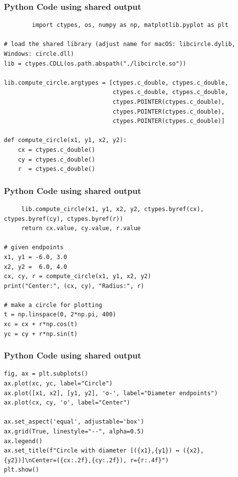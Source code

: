 \documentclass{beamer}
\begin{document}
\begin{frame}[fragile]
	\frametitle{Python Code using shared output}
	\begin{lstlisting}
		import ctypes, os, numpy as np, matplotlib.pyplot as plt

# load the shared library (adjust name for macOS: libcircle.dylib, Windows: circle.dll)
lib = ctypes.CDLL(os.path.abspath("./libcircle.so"))

lib.compute_circle.argtypes = [ctypes.c_double, ctypes.c_double,
                               ctypes.c_double, ctypes.c_double,
                               ctypes.POINTER(ctypes.c_double),
                               ctypes.POINTER(ctypes.c_double),
                               ctypes.POINTER(ctypes.c_double)]

def compute_circle(x1, y1, x2, y2):
    cx = ctypes.c_double()
    cy = ctypes.c_double()
    r  = ctypes.c_double()
	\end{lstlisting}
\end{frame}
\begin{frame}[fragile]
	\frametitle{Python Code using shared output}
	\begin{lstlisting}	
     lib.compute_circle(x1, y1, x2, y2, ctypes.byref(cx), ctypes.byref(cy), ctypes.byref(r))
     return cx.value, cy.value, r.value

# given endpoints
x1, y1 = -6.0, 3.0
x2, y2 =  6.0, 4.0
cx, cy, r = compute_circle(x1, y1, x2, y2)
print("Center:", (cx, cy), "Radius:", r)

# make a circle for plotting
t = np.linspace(0, 2*np.pi, 400)
xc = cx + r*np.cos(t)
yc = cy + r*np.sin(t)

	\end{lstlisting}
\end{frame}
\begin{frame}[fragile]
	\frametitle{Python Code using shared output}
	\begin{lstlisting}
fig, ax = plt.subplots()
ax.plot(xc, yc, label="Circle")
ax.plot([x1, x2], [y1, y2], 'o-', label="Diameter endpoints")
ax.plot(cx, cy, 'o', label="Center")

ax.set_aspect('equal', adjustable='box')
ax.grid(True, linestyle="--", alpha=0.5)
ax.legend()
ax.set_title(f"Circle with diameter [({x1},{y1}) ↔ ({x2},{y2})]\nCenter=({cx:.2f},{cy:.2f}), r={r:.4f}")
plt.show()
	\end{lstlisting}
\end{frame}
\end{document}
